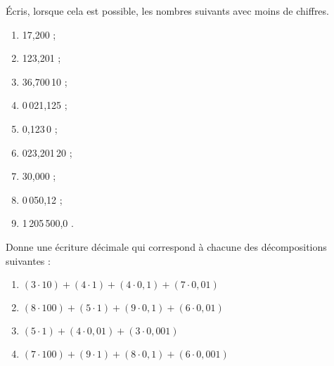 \begin{exercice}
Écris, lorsque cela est possible, les nombres suivants avec moins de chiffres.
\begin{enumerate} 
 \item 17,200 \dotfill ; \hspace*{13em}
 
 \item 123,201 \dotfill ; \hspace*{13em}
 
 \item 36,700\,10 \dotfill ; \hspace*{13em}
 
 \item 0\,021,125 \dotfill ; \hspace*{13em}
 
 \item 0,123\,0 \dotfill ; \hspace*{13em}
 
 \item 023,201\,20 \dotfill ; \hspace*{13em}
 
 \item 30,000 \dotfill ; \hspace*{13em}
 
 \item 0\,050,12 \dotfill ; \hspace*{13em}
 
 \item 1\,205\,500,0 \dotfill. \hspace*{13em}
 
 \end{enumerate}
\end{exercice}


\begin{exercice}[Décomposition]
Donne une écriture décimale qui correspond à chacune des décompositions suivantes :
\begin{enumerate}
 \item $(3 \cdot 10) + (4 \cdot 1) + (4 \cdot 0,1) + (7 \cdot 0,01)$
 \item $(8 \cdot 100) + (5 \cdot 1) + (9 \cdot 0,1) + (6 \cdot 0,01)$
 \item $(5 \cdot 1) + (4 \cdot 0,01) + (3 \cdot 0,001)$
 \item $(7 \cdot 100) + (9 \cdot 1) + (8 \cdot 0,1) + (6 \cdot 0,001)$
 \end{enumerate}
\end{exercice}


